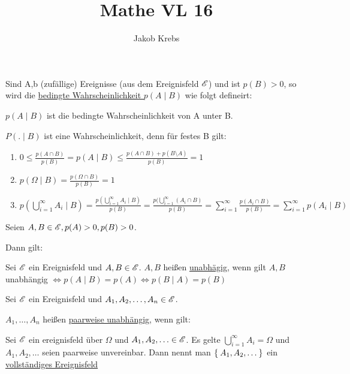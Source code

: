 \documentclass{../tudscript}
\author{Jakob Krebs}
\title{Mathe VL 16}
\begin{document}

Sind A,b (zufällige) Ereignisse (aus dem Ereignisfeld $\mathscr{E}$) und ist $p(B) > 0$, so wird die \underline{bedingte Wahrscheinlichkeit $p(A \mid B)$} wie folgt defineirt:

$p(A\mid B)$ ist die bedingte Wahrscheinlichkeit von A unter B.

$P(. \mid B)$ ist eine Wahrscheinlichkeit, denn  für festes B gilt:

\begin{enumerate}
\item $0 \leq \frac{p(A \cap B)}{p(B)} = p(A \mid B) \leq \frac{p(A\cap B) + p(B \setminus A)}{p(B)} = 1$
\item $p(\Omega \mid B) = \frac{p(\Omega \cap B)}{p(B)} = 1$
\item $p(\bigcup_{i =1}^\infty A_i \mid B) = \frac{p(\bigcup_{i =1}^\infty A_i \mid B)}{p(B)} = \frac{p(\bigcup_{i =1}^\infty (A_i \cap B)}{p(B)} = \sum_{i =1}^\infty \frac{p(A_i \cap B)}{p(B)} = \sum_{i =1}^\infty p(A_i \mid B)$
\end{enumerate}

Seien $A, B \in \mathscr{E}, p(A) > 0, p(B) > 0$. 

Dann gilt:

Sei $\mathscr{E}$ ein Ereignisfeld und $A, B \in \mathscr{E}$. $A, B$ heißen \underline{unabhägig}, wenn gilt
$A, B$ unabhängig $\iff p(A \mid B) = p(A) \iff p(B \mid A) = p(B)$

Sei $\mathscr{E}$ ein Ereignisfeld und $A_1, A_2, \ldots, A_n \in \mathscr{E}$.

$A_1, \ldots, A_n$ heißen \underline{paarweise unabhängig}, wenn gilt:

Sei $\mathscr{E}$ ein ereignisfeld über $\Omega$ und $A_1, A_2, \ldots \in \mathscr{E}$. Es gelte
$\bigcup_{i =1}^\infty A_i = \Omega$ und $A_1, A_2, \ldots$ seien paarweise unvereinbar.
Dann nennt man $\Set{A_1, A_2, \ldots}$ ein \underline{vollständiges Ereignisfeld}
\end{document}
